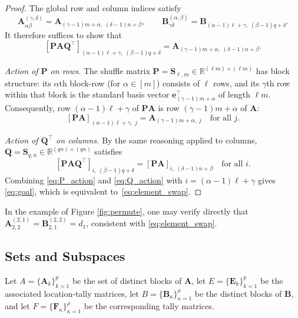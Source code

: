 \documentclass{siamart251216}
\newcommand{\RR}[2]{\mathbb{R}^{#1 \times #2}}
\def\bA{\mathbf{A}}
\def\bB{\mathbf{B}}
\def\bE{\mathbf{E}}
\def\bF{\mathbf{F}}
\def\bP{\mathbf{P}}
\def\bQ{\mathbf{Q}}
\def\bS{\mathbf{S}}
\def\be{\mathbf{e}}
\begin{document}
\begin{proof}
The global row and column indices satisfy
\begin{equation}
\label{eq:index_translation}
    \bA^{(\gamma,\delta)}_{\alpha\beta} = \bA_{(\gamma-1)m+\alpha,\;(\delta-1)n+\beta},
    \qquad
    \bB^{(\alpha,\beta)}_{\gamma\delta} = \bB_{(\alpha-1)\ell+\gamma,\;(\beta-1)q+\delta}.
\end{equation}
It therefore suffices to show that
\begin{equation}
\label{eq:goal}
    [\bP\bA\bQ^\top]_{(\alpha-1)\ell+\gamma,\;(\beta-1)q+\delta}
    = \bA_{(\gamma-1)m+\alpha,\;(\delta-1)n+\beta}.
\end{equation}

\medskip\noindent\textit{Action of $\bP$ on rows.}
The shuffle matrix $\bP = \bS_{\ell,m}\in\RR{(\ell m)}{(\ell m)}$ has block structure: its $\alpha$th
block-row (for $\alpha\in[m]$) consists of $\ell$ rows, and its $\gamma$th row within that block
is the standard basis vector $\be_{(\gamma-1)m+\alpha}^\top$ of length $\ell m$.  Consequently,
row $(\alpha-1)\ell+\gamma$ of $\bP\bA$ is row $(\gamma-1)m+\alpha$ of $\bA$:
\begin{equation}
\label{eq:P_action}
    [\bP\bA]_{(\alpha-1)\ell+\gamma,\;j} = \bA_{(\gamma-1)m+\alpha,\;j}
    \quad\text{for all }j.
\end{equation}

\medskip\noindent\textit{Action of $\bQ^\top$ on columns.}
By the same reasoning applied to columns, $\bQ = \bS_{q,n}\in\RR{(qn)}{(qn)}$ satisfies
\begin{equation}
\label{eq:Q_action}
    [\bP\bA\bQ^\top]_{i,\;(\beta-1)q+\delta} = [\bP\bA]_{i,\;(\delta-1)n+\beta}
    \quad\text{for all }i.
\end{equation}
Combining \eqref{eq:P_action} and \eqref{eq:Q_action} with $i=(\alpha-1)\ell+\gamma$ gives
\eqref{eq:goal}, which is equivalent to~\eqref{eq:element_swap}.
\end{proof}

In the example of Figure \ref{fig:permute}, one may verify directly that $\bA^{(2,1)}_{2,2} = \bB^{(2,2)}_{2,1} = d_1$, consistent with \eqref{eq:element_swap}.

\subsection{Sets and Subspaces}
\label{subsec:sets_and_spaces}

Let $A = \{\bA_k\}_{k=1}^p$ be the set of distinct blocks of $\bA$, let
$E = \{\bE_k\}_{k=1}^p$ be the associated location-tally matrices, let
$B = \{\bB_\kappa\}_{\kappa=1}^\rho$ be the distinct blocks of $\bB$, and let
$F = \{\bF_\kappa\}_{\kappa=1}^\rho$ be the corresponding tally matrices.
\end{document}
